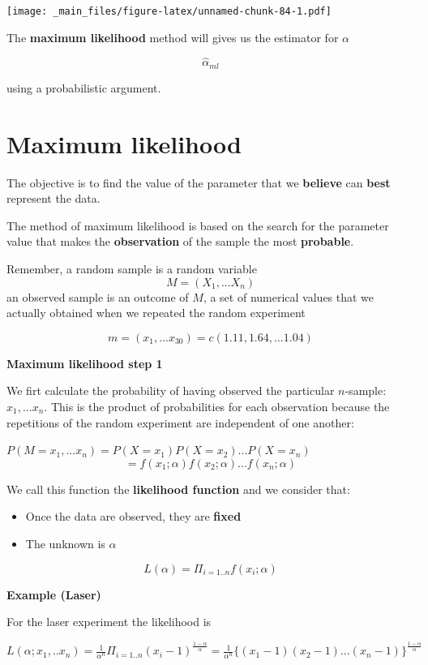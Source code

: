 \documentclass[
]{book}
\providecommand{\tightlist}{%
  \setlength{\itemsep}{0pt}\setlength{\parskip}{0pt}}
\begin{document}
\texttt{[image: \_main\_files/figure-latex/unnamed-chunk-84-1.pdf]}

The \textbf{maximum likelihood} method will gives us the estimator for \(\alpha\)

\[\hat{\alpha}_{ml}\]

using a probabilistic argument.

\hypertarget{maximum-likelihood-2}{%
\section{Maximum likelihood}\label{maximum-likelihood-2}}

The objective is to find the value of the parameter that we \textbf{believe} can \textbf{best} represent the data.

The method of maximum likelihood is based on the search for the parameter value that makes the \textbf{observation} of the sample the most \textbf{probable}.

Remember, a random sample is a random variable
\[M=(X_1,...X_n)\]
an observed sample is an outcome of \(M\), a set of numerical values that we actually obtained when we repeated the random experiment

\[m=(x_1,...x_{30})=c(1.11, 1.64, ... 1.04)\]

\textbf{Maximum likelihood step 1}

We firt calculate the probability of having observed the particular \(n\)-sample: \(x_1,...x_n\). This is the product of probabilities for each observation because the repetitions of the random experiment are independent of one another:

\(P(M=x_1,...x_n)=P(X=x_1)P(X=x_2)...P(X=x_n)\)
\[=f(x_1;\alpha)f(x_2;\alpha) ...f(x_n;\alpha)\]

We call this function the \textbf{likelihood function} and we consider that:

\begin{itemize}
\tightlist
\item
  Once the data are observed, they are \textbf{fixed}
\item
  The unknown is \(\alpha\)
\end{itemize}

\[L(\alpha)= \Pi_{i=1..n} f(x_i; \alpha)\]

\textbf{Example (Laser)}

For the laser experiment the likelihood is

\(L(\alpha;x_1,..x_n)= \frac{1}{\alpha^n} \Pi_{i=1..n} (x_i-1)^{\frac{1-\alpha}{\alpha}}= \frac{1}{\alpha^n} \{(x_1-1)(x_2-1)...(x_n-1)\}^{\frac{1-\alpha}{\alpha}}\)
\end{document}
